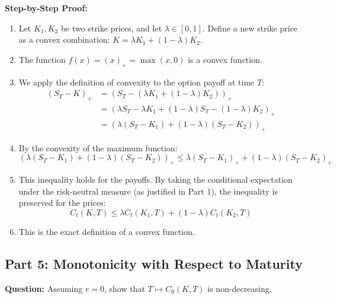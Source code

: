 \textbf{Step-by-Step Proof:}
\begin{enumerate}
    \item Let $K_1, K_2$ be two strike prices, and let $\lambda \in [0,1]$. Define a new strike price as a convex combination: $K = \lambda K_1 + (1-\lambda) K_2$.
    \item The function $f(x) = (x)_+ = \max(x, 0)$ is a convex function.
    \item We apply the definition of convexity to the option payoff at time $T$:
    \begin{align}
        (S_T - K)_+ &= (S_T - (\lambda K_1 + (1-\lambda)K_2))_+ \\
        &= (\lambda S_T - \lambda K_1 + (1-\lambda)S_T - (1-\lambda)K_2)_+ \\
        &= (\lambda(S_T - K_1) + (1-\lambda)(S_T - K_2))_+
    \end{align}
    \item By the convexity of the maximum function:
    \begin{equation}
        (\lambda(S_T - K_1) + (1-\lambda)(S_T - K_2))_+ \le \lambda(S_T - K_1)_+ + (1-\lambda)(S_T - K_2)_+
    \end{equation}
    \item This inequality holds for the payoffs. By taking the conditional expectation under the risk-neutral measure (as justified in Part 1), the inequality is preserved for the prices:
    \begin{equation}
        C_t(K, T) \le \lambda C_t(K_1, T) + (1-\lambda) C_t(K_2, T)
    \end{equation}
    \item This is the exact definition of a convex function.
\end{enumerate}

\subsection{Part 5: Monotonicity with Respect to Maturity}

\textbf{Question:} Assuming $r=0$, show that $T \mapsto C_0(K,T)$ is non-decreasing.

